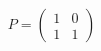 \documentclass[preview]{standalone}
\begin{document}
\begin{align*}
P = \begin{pmatrix} 1 & 0 \\ 1 & 1 \end{pmatrix}
\end{align*}
\end{document}
